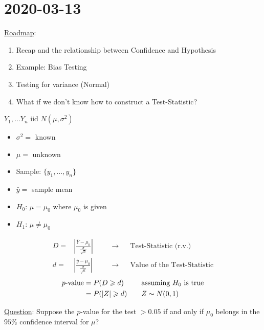 \section{2020-03-13}
\underline{Roadmap}:
\begin{enumerate}[label=(\roman*)]
    \item Recap and the relationship between Confidence and Hypothesis
    \item Example: Bias Testing
    \item Testing for variance (Normal)
    \item What if we don't know how to construct a Test-Statistic?
\end{enumerate}

\begin{exbox}
    \begin{example}
        $ Y_1,\ldots Y_n $ iid $ N(\mu,\sigma^2) $
        \begin{itemize}
            \item $ \sigma^2= $ known
            \item $ \mu= $ unknown
            \item Sample: $ \{y_1,\ldots ,y_n\} $
            \item $ \bar{y}= $ sample mean
            \item $ H_0 $: $ \mu=\mu_0 $ where $ \mu_0 $ is given
            \item $ H_1 $: $ \mu \neq \mu_0 $
        \end{itemize}
        \[
            \begin{aligned}
                D= & \left|\frac{\bar{Y}-\mu_0}{\frac{\sigma}{\sqrt{n}}} \right|
                   & \quad                                                       & \rightarrow &  & \text{Test-Statistic (r.v.)}       \\
                d= & \left|\frac{\bar{y}-\mu_0}{\frac{\sigma}{\sqrt{n}}} \right|
                   &                                                             & \rightarrow &  & \text{Value of the Test-Statistic}
            \end{aligned}
        \]
        \[
            \begin{aligned}
                p\text{-value}
                 & =P(D\geqslant d)   & \quad & \text{assuming }H_0\text{ is true} \\
                 & =P(|Z|\geqslant d) &       & Z \thicksim N(0,1)
            \end{aligned}
        \]
    \end{example}
\end{exbox}
\underline{Question}: Suppose the $ p $-value for the test $ >0.05 $
if and only if $ \mu_0 $ belongs in the $ 95\% $ confidence interval for $ \mu $?

